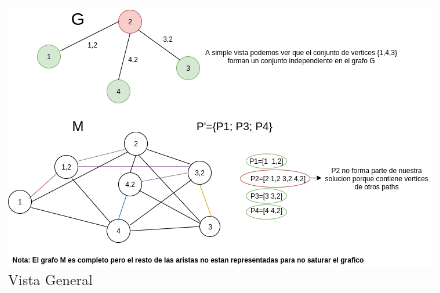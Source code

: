 \begin{figure}[H]
\centering
\includegraphics[width=1.148\textwidth]{Informe/Imagenes/Parte1/grafico 5.png}
\caption{\label{fig:class01} Vista General}
\end{figure}


